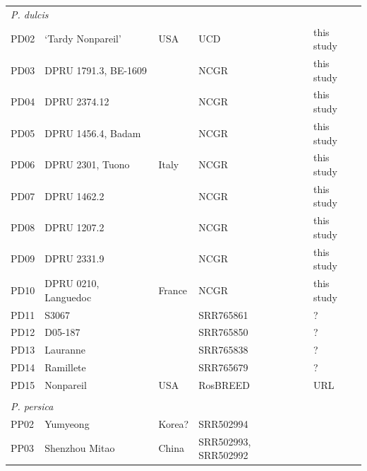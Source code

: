 \documentclass[12pt]{article}
\begin{document}
\begin{center}
\begin{longtable}{lllll}
                 \multicolumn{5}{l}{\em{P. dulcis}}  \\
                 PD02 &‘Tardy Nonpareil’ &USA &UCD &this study\\ %
                 PD03 &DPRU 1791.3, BE-1609 & &NCGR &this study\\ %
                 PD04 &DPRU 2374.12 & &NCGR &this study\\ %
                 PD05 &DPRU 1456.4, Badam & &NCGR &this study\\ %
                 PD06 &DPRU 2301, Tuono &Italy &NCGR &this study\\ %
                 PD07 &DPRU 1462.2 & &NCGR &this study\\ %
                 PD08 &DPRU 1207.2 & &NCGR &this study\\ %
                 PD09 &DPRU 2331.9 & &NCGR &this study\\ %
                 PD10 &DPRU 0210, Languedoc &France &NCGR &this study\\ %
                 PD11 &S3067 & &SRR765861 &\citealt{koepke2013comparative}?\\
                 PD12 &D05-187 & &SRR765850 &\citealt{koepke2013comparative}?\\
                 PD13 &Lauranne & &SRR765838 &\citealt{koepke2013comparative}?\\
                 PD14 &Ramillete & &SRR765679 &\citealt{koepke2013comparative}?\\
                 PD{\color{red}15} &Nonpareil & USA&RosBREED &URL \\
                 \\
                 \multicolumn{5}{l}{\em{P. persica}}  \\ %
                 PP02 &Yumyeong &Korea? &SRR502994 &\citealt{verde2013high}\\
                 PP03 &Shenzhou Mitao&China &\multirow{2}{1cm}{SRR502993, SRR502992} &\citealt{verde2013high}\\

\end{longtable}
\end{center}
\end{document}
